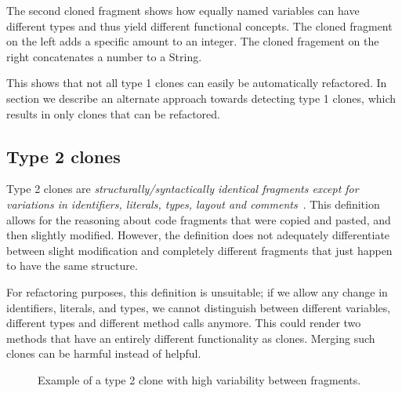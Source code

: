 The second cloned fragment shows how equally named variables can have different types and thus yield different functional concepts. The cloned fragment on the left adds a specific amount to an integer. The cloned fragement on the right concatenates a number to a String.

This shows that not all type 1 clones can easily be automatically refactored. In section \label{chap:type1rclones} we describe an alternate approach towards detecting type 1 clones, which results in only clones that can be refactored.

\subsection{Type 2 clones}\label{sec:type2}
Type 2 clones are \textit{structurally/syntactically identical fragments except for variations in identifiers, literals, types, layout and comments}~\cite{roy2007survey}. This definition allows for the reasoning about code fragments that were copied and pasted, and then slightly modified. However, the definition does not adequately differentiate between slight modification and completely different fragments that just happen to have the same structure.

For refactoring purposes, this definition is unsuitable; if we allow any change in identifiers, literals, and types, we cannot distinguish between different variables, different types and different method calls anymore. This could render two methods that have an entirely different functionality as clones. Merging such clones can be harmful instead of helpful.

\begin{figure}[H]
\begin{parcolumns}{2}
\end{parcolumns}
\caption{Example of a type 2 clone with high variability between fragments.}
\label{fig:type2}
\end{figure}

